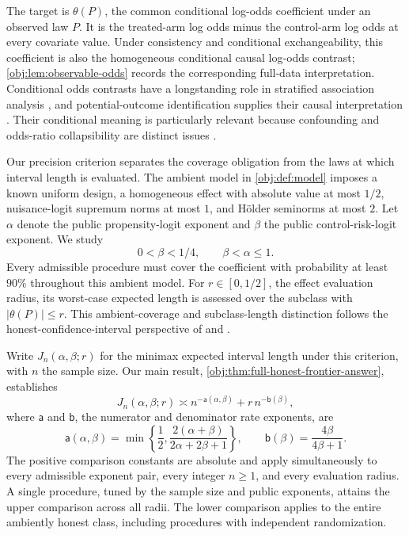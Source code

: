 \documentclass[11pt]{article}
\begin{document}
The target is \(\theta(P)\), the common conditional log-odds coefficient under an observed law \(P\). It is the treated-arm log odds minus the control-arm log odds at every covariate value. Under consistency and conditional exchangeability, this coefficient is also the homogeneous conditional causal log-odds contrast; \cref{obj:lem:observable-odds} records the corresponding full-data interpretation. Conditional odds contrasts have a longstanding role in stratified association analysis \citep{Mantel1959}, and potential-outcome identification supplies their causal interpretation \citep{Rubin1974,Rosenbaum1983}. Their conditional meaning is particularly relevant because confounding and odds-ratio collapsibility are distinct issues \citep{Greenland1999}.

Our precision criterion separates the coverage obligation from the laws at which interval length is evaluated. The ambient model in \cref{obj:def:model} imposes a known uniform design, a homogeneous effect with absolute value at most \(1/2\), nuisance-logit supremum norms at most \(1\), and Hölder seminorms at most \(2\). Let \(\alpha\) denote the public propensity-logit exponent and \(\beta\) the public control-risk-logit exponent. We study
\[
0<\beta<1/4,\qquad \beta<\alpha\le1.
\]
Every admissible procedure must cover the coefficient with probability at least \(90\%\) throughout this ambient model. For \(r\in[0,1/2]\), the effect evaluation radius, its worst-case expected length is assessed over the subclass with \(|\theta(P)|\le r\). This ambient-coverage and subclass-length distinction follows the honest-confidence-interval perspective of \citet{Low1997} and \citet[Section 2, Theorem 1]{CaiLow2004ConfidenceAdaptation}.

Write \(J_n(\alpha,\beta;r)\) for the minimax expected interval length under this criterion, with \(n\) the sample size. Our main result, \cref{obj:thm:full-honest-frontier-answer}, establishes
\[
J_n(\alpha,\beta;r)
\asymp
n^{-\mathsf a(\alpha,\beta)}
+r\,n^{-\mathsf b(\beta)},
\]
where \(\mathsf a\) and \(\mathsf b\), the numerator and denominator rate exponents, are
\[
\mathsf a(\alpha,\beta)
=\min\left\{\frac12,\frac{2(\alpha+\beta)}{2\alpha+2\beta+1}\right\},
\qquad
\mathsf b(\beta)=\frac{4\beta}{4\beta+1}.
\]
The positive comparison constants are absolute and apply simultaneously to every admissible exponent pair, every integer \(n\ge1\), and every evaluation radius. A single procedure, tuned by the sample size and public exponents, attains the upper comparison across all radii. The lower comparison applies to the entire ambiently honest class, including procedures with independent randomization.
\end{document}
